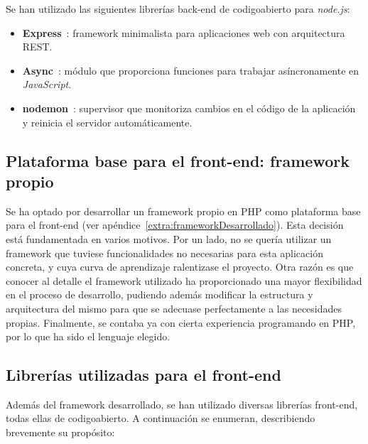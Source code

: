 Se han utilizado las siguientes librerías \gls{back-end} de \gls{codigoabierto} para \textit{node.js}:

\begin{itemize}
  \item \textbf{Express}~\cite{express}: \gls{framework} minimalista para aplicaciones web con arquitectura \gls{REST}.

  \item \textbf{Async}~\cite{async}: módulo que proporciona funciones para trabajar asíncronamente en \textit{JavaScript}.

  \item \textbf{nodemon}~\cite{nodemon}: supervisor que monitoriza cambios en el código de la aplicación y reinicia el servidor automáticamente.

\end{itemize}

\subsection*{Plataforma base para el front-end: framework propio\label{ssec:dp:front-end}}

Se ha optado por desarrollar un \gls{framework} propio en \gls{PHP} como plataforma base para el \gls{front-end} (ver apéndice~\ref{extra:frameworkDesarrollado}).
Esta decisión está fundamentada en varios motivos.
Por un lado, no se quería utilizar un \gls{framework} que tuviese funcionalidades no necesarias para esta aplicación concreta, y cuya curva de aprendizaje ralentizase el proyecto.
Otra razón es que conocer al detalle el \gls{framework} utilizado ha proporcionado una mayor flexibilidad en el proceso de desarrollo, pudiendo además modificar la estructura y arquitectura del mismo para que se adecuase perfectamente a las necesidades propias.
Finalmente, se contaba ya con cierta experiencia programando en \gls{PHP}, por lo que ha sido el lenguaje elegido.

\subsection*{Librerías utilizadas para el front-end\label{ssec:dp:front-end-libs}}

Además del \gls{framework} desarrollado, se han utilizado diversas librerías \gls{front-end}, todas ellas de \gls{codigoabierto}.
A continuación se enumeran, describiendo brevemente su propósito:

